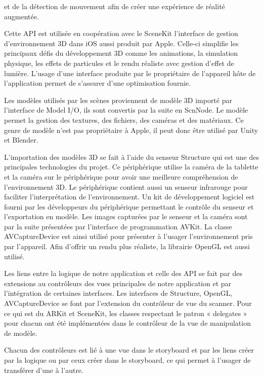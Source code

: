 \documentclass[letterpaper,twoside,12pt,french]{report}
\begin{document}
et de la détection de mouvement afin de créer une expérience de réalité augmentée.\citep*{aRKitDoc}
\par
Cette API est utilisée en coopération avec le SceneKit l'interface de gestion d'environnement 3D
dans iOS aussi produit par Apple. Celle-ci simplifie les principaux défis du développement 3D comme
les animations, la simulation physique, les effets de particules et le rendu réaliste avec gestion
d'effet de lumière. L'usage d'une interface produite par le propriétaire de l'appareil hôte de
l'application permet de s'assurer d'une optimisation fournie.\citep*{sceneKitDoc}
\par
Les modèles utilisés par les scènes proviennent de modèle 3D importé par l'interface de Model I/O,
ils sont convertis par la suite en ScnNode. Le modèle permet la gestion des textures, des fichiers, des
caméras et des matériaux.\citep*{modelIODoc} Ce genre de modèle n'est pas propriétaire à Apple, il peut donc être
utilisé par Unity\citep*{unityDoc} et Blender\citep*{blenderForumsRichardMarklew}.
\par
L'importation des modèles 3D se fait à l'aide du senseur Structure qui est une des principales technologies
du projet. Ce périphérique utilise la caméra de la tablette et la caméra sur le périphérique pour
avoir une meilleure compréhension de l'environnement 3D. Le périphérique contient aussi un senseur
infrarouge pour faciliter l'interprétation de l'environnement. Un kit de développement logiciel est
fourni par les développeurs du périphérique permettant le contrôle du senseur et l'exportation en
modèle.\citep*{occipitalsdk} Les images capturées par le senseur et la caméra sont par la suite présentées par
l'interface de programmation AVKit. La classe AVCaptureDevice est ainsi utilisé pour présenter à
l'usager l'environnement pris par l'appareil.\citep*{aVKitDoc} Afin d'offrir un rendu plus réaliste, la librairie
OpenGL est aussi utilisé.\citep*{openGLESDoc}
\par
Les liens entre la logique de notre application et celle des API se fait par des extensions au
contrôleurs des vues principales de notre application et par l'intégration de certaines interfaces.
Les interfaces de Structure, OpenGL, AVCaptureDevice se font par l'extension du contrôleur de vue du
scanner. Pour ce qui est du ARKit et SceneKit, les classes respectant le patron « delegates » pour chacun ont été implémentées dans
le contrôleur de la vue de manipulation de modèle.
\par
Chacun des contrôleurs est lié à une vue dans le storyboard et par les liens créer par la logique ou
par ceux créer dans le storyboard, ce qui permet à l'usager de transférer d'une à l'autre.
\end{document}
